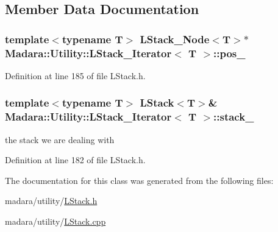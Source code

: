 \subsection{Member Data Documentation}
\hypertarget{classMadara_1_1Utility_1_1LStack__Iterator_a8951a9c2a00f7e7b0a18104f322c3007}{
\subsubsection[{pos\_\-}]{\setlength{\rightskip}{0pt plus 5cm}template$<$typename T$>$ {\bf LStack\_\-Node}$<$T$>$$\ast$ {\bf Madara::Utility::LStack\_\-Iterator}$<$ T $>$::{\bf pos\_\-}}}
\label{df/d6e/classMadara_1_1Utility_1_1LStack__Iterator_a8951a9c2a00f7e7b0a18104f322c3007}


Definition at line 185 of file LStack.h.

\hypertarget{classMadara_1_1Utility_1_1LStack__Iterator_ae3dbe2ad34a37cc94914706446a6f1f8}{
\subsubsection[{stack\_\-}]{\setlength{\rightskip}{0pt plus 5cm}template$<$typename T$>$ {\bf LStack}$<$T$>$\& {\bf Madara::Utility::LStack\_\-Iterator}$<$ T $>$::{\bf stack\_\-}}}
\label{df/d6e/classMadara_1_1Utility_1_1LStack__Iterator_ae3dbe2ad34a37cc94914706446a6f1f8}


the stack we are dealing with 



Definition at line 182 of file LStack.h.



The documentation for this class was generated from the following files:\begin{DoxyCompactItemize}
\item 
madara/utility/\hyperlink{LStack_8h}{LStack.h}\item 
madara/utility/\hyperlink{LStack_8cpp}{LStack.cpp}\end{DoxyCompactItemize}
